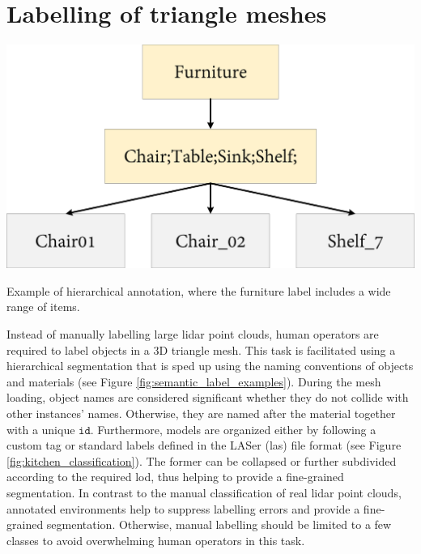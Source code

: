 \section{Labelling of triangle meshes}

\begin{marginfigure}[1.5cm]
    \centering
    \includegraphics[width=\linewidth]{figs/lidar_simulation/semantic_labels_example.png}
	\caption{Example of hierarchical annotation, where the furniture label includes a wide range of items. }
	\label{fig:semantic_label_examples}
\end{marginfigure}
Instead of manually labelling large \acrshort{lidar} point clouds, human operators are required to label objects in a 3D triangle mesh. This task is facilitated using a hierarchical segmentation that is sped up using the naming conventions of objects and materials (see Figure \ref{fig:semantic_label_examples}). During the mesh loading, object names are considered significant whether they do not collide with other instances' names. Otherwise, they are named after the material together with a unique $\mathtt{id}$. Furthermore, models are organized either by following a custom tag or standard labels defined in the LASer (\acrshort{las}) file format (see Figure \ref{fig:kitchen_classification}). The former can be collapsed or further subdivided according to the required \acrshort{lod}, thus helping to provide a fine-grained segmentation. In contrast to the manual classification of real \acrshort{lidar} point clouds, annotated environments help to suppress labelling errors and provide a fine-grained segmentation. Otherwise, manual labelling should be limited to a few classes to avoid overwhelming human operators in this task.

